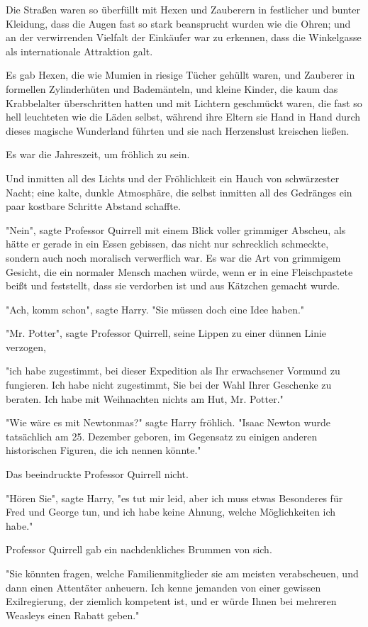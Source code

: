 {Die Straßen waren so überfüllt mit Hexen und Zauberern in festlicher und bunter Kleidung, dass die Augen fast so stark beansprucht wurden wie die Ohren; und an der verwirrenden Vielfalt der Einkäufer war zu erkennen, dass die Winkelgasse als internationale Attraktion galt.

Es gab Hexen, die wie Mumien in riesige Tücher gehüllt waren, und Zauberer in formellen Zylinderhüten und Bademänteln, und kleine Kinder, die kaum das Krabbelalter überschritten hatten und mit Lichtern geschmückt waren, die fast so hell leuchteten wie die Läden selbst, während ihre Eltern sie Hand in Hand durch dieses magische Wunderland führten und sie nach Herzenslust kreischen ließen.

Es war die Jahreszeit, um fröhlich zu sein.

Und inmitten all des Lichts und der Fröhlichkeit ein Hauch von schwärzester Nacht; eine kalte, dunkle Atmosphäre, die selbst inmitten all des Gedränges ein paar kostbare Schritte Abstand schaffte.

"Nein", sagte Professor Quirrell mit einem Blick voller grimmiger Abscheu, als hätte er gerade in ein Essen gebissen, das nicht nur schrecklich schmeckte, sondern auch noch moralisch verwerflich war. Es war die Art von grimmigem Gesicht, die ein normaler Mensch machen würde, wenn er in eine Fleischpastete beißt und feststellt, dass sie verdorben ist und aus Kätzchen gemacht wurde.

"Ach, komm schon", sagte Harry. "Sie müssen doch eine Idee haben."

"Mr. Potter", sagte Professor Quirrell, seine Lippen zu einer dünnen Linie verzogen,

"ich habe zugestimmt, bei dieser Expedition als Ihr erwachsener Vormund zu fungieren. Ich habe nicht zugestimmt, Sie bei der Wahl Ihrer Geschenke zu beraten. Ich habe mit Weihnachten nichts am Hut, Mr. Potter."

"Wie wäre es mit Newtonmas?" sagte Harry fröhlich. "Isaac Newton wurde tatsächlich am 25. Dezember geboren, im Gegensatz zu einigen anderen historischen Figuren, die ich nennen könnte."

Das beeindruckte Professor Quirrell nicht.

"Hören Sie", sagte Harry, "es tut mir leid, aber ich muss etwas Besonderes für Fred und George tun, und ich habe keine Ahnung, welche Möglichkeiten ich habe."

Professor Quirrell gab ein nachdenkliches Brummen von sich.

"Sie könnten fragen, welche Familienmitglieder sie am meisten verabscheuen, und dann einen Attentäter anheuern. Ich kenne jemanden von einer gewissen Exilregierung, der ziemlich kompetent ist, und er würde Ihnen bei mehreren Weasleys einen Rabatt geben."

}

